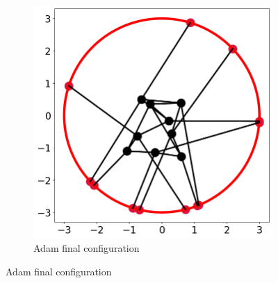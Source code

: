 \documentclass[12pt]{article}
\newcommand{\0}{\boldsymbol{0}}
\begin{document}
\begin{figure}[h!]
\begin{subfigure}[b]{0.3\textwidth}
    \end{subfigure}
    \hfill
    \begin{subfigure}[b]{0.3\textwidth}
        \centering
        \includegraphics[width=\textwidth]{../img/problem_2/adam_random.png}
        \caption{Adam final configuration}
        \label{fig:adam_config_random}
        

\end{subfigure}
\end{figure}
\end{document}
